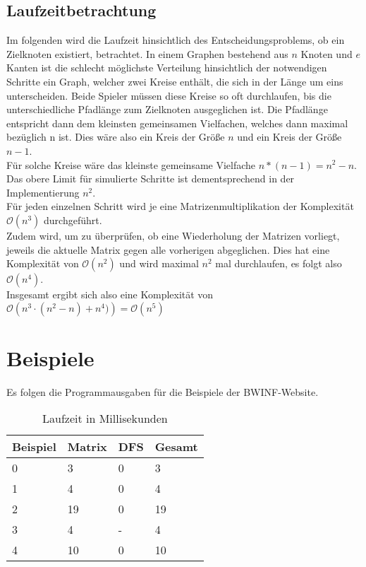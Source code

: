 \subsection{Laufzeitbetrachtung}\label{subsec:laufzeitbetrachtung}
Im folgenden wird die Laufzeit hinsichtlich des Entscheidungsproblems, ob ein Zielknoten existiert, betrachtet.
In einem Graphen bestehend aus $n$ Knoten und $e$ Kanten ist die schlecht möglichste Verteilung hinsichtlich der notwendigen Schritte
ein Graph, welcher zwei Kreise enthält, die sich in der Länge um eins unterscheiden.
Beide Spieler müssen diese Kreise so oft durchlaufen, bis die unterschiedliche Pfadlänge zum Zielknoten ausgeglichen ist.
Die Pfadlänge entspricht dann dem kleinsten gemeinsamen Vielfachen, welches dann maximal bezüglich n ist.
Dies wäre also ein Kreis der Größe $n$ und ein Kreis der Größe $n - 1$. \\
Für solche Kreise wäre das kleinste gemeinsame Vielfache $n * \left(n - 1\right) = n^2 - n$. \\
Das obere Limit für simulierte Schritte ist dementsprechend in der Implementierung $n^2$. \\
Für jeden einzelnen Schritt wird je eine Matrizenmultiplikation der Komplexität $\mathcal{O}(n^3)$ durchgeführt. \\
Zudem wird, um zu überprüfen, ob eine Wiederholung der Matrizen vorliegt, jeweils die aktuelle Matrix gegen alle vorherigen abgeglichen.
Dies hat eine Komplexität von $\mathcal{O}\left(n^2\right)$ und wird
maximal $n^2$ mal durchlaufen, es folgt also $\mathcal{O}\left(n^4\right)$. \\
Insgesamt ergibt sich also eine Komplexität von $\mathcal{O}\left(n^3 \cdot \left(n^2 - n\right) + n^4)\right) = \mathcal{O}\left(n^5\right)$


\section{Beispiele}\label{sec:beispiele}
Es folgen die Programmausgaben für die Beispiele der BWINF-Website. \\
\begin{table}[h]
    \centering
    \begin{tabular}{|l|l|l|l|}
        \hline
        Beispiel & Matrix & DFS & Gesamt \\ \hline
        0        & 3      & 0   & 3      \\ \hline
        1        & 4      & 0   & 4      \\ \hline
        2        & 19     & 0   & 19     \\ \hline
        3        & 4      & -   & 4      \\ \hline
        4        & 10     & 0   & 10     \\ \hline
    \end{tabular}
    \caption{Laufzeit in Millisekunden}
    \label{tab:my-table}
\end{table}
